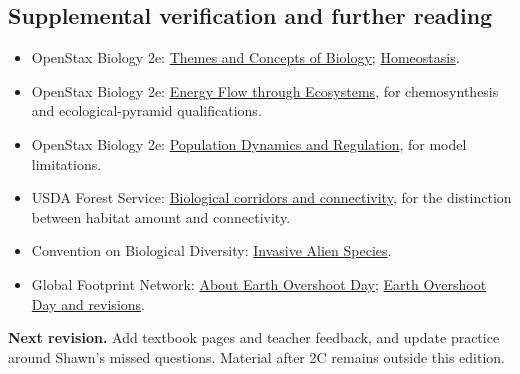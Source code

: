 \documentclass[11pt,letterpaper]{article}
\begin{document}
\subsection*{Supplemental verification and further reading}
\begin{itemize}
\item OpenStax Biology 2e: \href{https://openstax.org/books/biology-2e/pages/1-2-themes-and-concepts-of-biology}{Themes and Concepts of Biology}; \href{https://openstax.org/books/biology-2e/pages/33-3-homeostasis}{Homeostasis}.
\item OpenStax Biology 2e: \href{https://openstax.org/books/biology-2e/pages/46-2-energy-flow-through-ecosystems}{Energy Flow through Ecosystems}, for chemosynthesis and ecological-pyramid qualifications.
\item OpenStax Biology 2e: \href{https://openstax.org/books/biology-2e/pages/45-4-population-dynamics-and-regulation}{Population Dynamics and Regulation}, for model limitations.
\item USDA Forest Service: \href{https://research.fs.usda.gov/treesearch/52660}{Biological corridors and connectivity}, for the distinction between habitat amount and connectivity.
\item Convention on Biological Diversity: \href{https://www.cbd.int/invasive}{Invasive Alien Species}.
\item Global Footprint Network: \href{https://overshoot.footprintnetwork.org/about-earth-overshoot-day/}{About Earth Overshoot Day}; \href{https://footprintnetwork.org/our-work/earth-overshoot-day/}{Earth Overshoot Day and revisions}.
\end{itemize}
\textbf{Next revision.} Add textbook pages and teacher feedback, and update practice around Shawn's missed questions. Material after 2C remains outside this edition.
\end{document}
